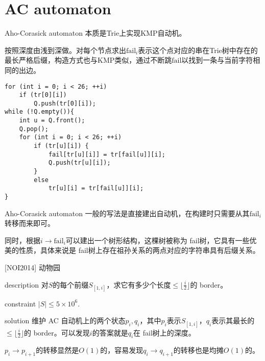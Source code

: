 \documentclass{beamer}
\theoremstyle{compact}
\def\le{\leqslant}
\def\fail{\textrm{fail}}
\begin{document}
\section{AC automaton}
\begin{frame}[fragile]{Aho-Corasick automaton}
	本质是Trie上实现KMP自动机。
	\pause
	
	按照深度由浅到深做。对每个节点求出$\fail_i$表示这个点对应的串在Trie树中存在的最长严格后缀，构造方式也与KMP类似，通过不断跳$\fail$以找到一条与当前字符相同的出边。
	\pause
	
\begin{verbatim}
for (int i = 0; i < 26; ++i)
    if (tr[0][i])
        Q.push(tr[0][i]);
while (!Q.empty()){
    int u = Q.front();
    Q.pop();
    for (int i = 0; i < 26; ++i)
        if (tr[u][i]) {
            fail[tr[u][i]] = tr[fail[u]][i];
            Q.push(tr[u][i]);
        }
        else
            tr[u][i] = tr[fail[u]][i];
}
\end{verbatim}
\end{frame}
\begin{frame}{Aho-Corasick automaton}
	一般的写法是直接建出自动机，在构建时只需要从其$\fail_i$转移而来即可。\\
	\pause
	
	同时，根据$i \to \textrm{fail}_i$可以建出一个树形结构，这棵树被称为 \fail 树，它具有一些优美的性质，具体来说是 \fail 树上存在祖孙关系的两点对应的字符串具有后缀关系。
\end{frame}
\begin{frame}{[NOI2014] 动物园}
	\begin{block}{description}
		对$S$的每个前缀$S_{[1, i]}$，求它有多少个长度$\le \lfloor \frac i2 \rfloor$的 border。
	\end{block}
	\begin{block}{constraint}
		$|S| \le 5 \times 10^6.$
	\end{block}
	\pause
	\begin{block}{solution}
		维护 AC 自动机上的两个状态$p_i, q_i$，其中$p_i$表示$S_{[1, i]}$，$q_i$表示其最长的$\le \lfloor \frac i2 \rfloor$的 border。可以发现$i$的答案就是$q_i$在 \fail 树上的深度。

		$p_i \to p_{i+1}$的转移显然是$O(1)$的，容易发现$q_i \to q_{i+1}$的转移也是均摊$O(1)$的。
	\end{block}
\end{frame}
\end{document}

